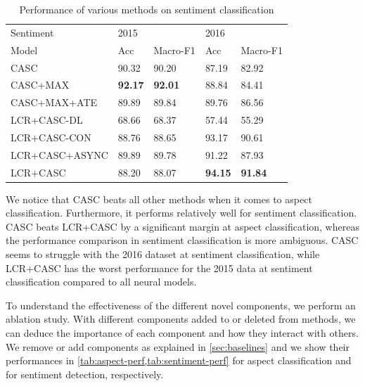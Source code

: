\documentclass[american, oneside]{ecsgdp}
\begin{document}
\begin{table}[htbp]
\centering
\caption{Performance of various methods on sentiment classification}
\label{tab:sentiment-perf}
\begin{tabular}{@{\extracolsep{4pt}}lllll@{}}
\hline
Sentiment      & 2015           &                & 2016           &                \\ \cline{2-3} \cline{4-5}
Model          & Acc            & Macro-F1       & Acc            & Macro-F1       \\ \hline
CASC           & 90.32          & 90.20          & 87.19          & 82.92          \\
CASC+MAX       & \textbf{92.17} & \textbf{92.01} & 88.84          & 84.41          \\
CASC+MAX+ATE   & 89.89          & 89.84          & 89.76          & 86.56          \\
LCR+CASC-DL    & 68.66          & 68.37          & 57.44          & 55.29          \\
LCR+CASC-CON   & 88.76          & 88.65          & 93.17          & 90.61          \\
LCR+CASC+ASYNC & 89.89	        & 89.78	         & 91.22	      & 87.93          \\
LCR+CASC       & 88.20          & 88.07          & \textbf{94.15} & \textbf{91.84} \\ \hline
\end{tabular}%
\end{table}

We notice that CASC beats all other methods when it comes to aspect classification. Furthermore, it performs relatively well for sentiment classification. CASC beats LCR+CASC by a significant margin at aspect classification, whereas the performance comparison in sentiment classification is more ambiguous. CASC seems to struggle with the 2016 dataset at sentiment classification, while LCR+CASC has the worst performance for the 2015 data at sentiment classification compared to all neural models.

To understand the effectiveness of the different novel components, we perform an ablation study. With different components added to or deleted from methods, we can deduce the importance of each component and how they interact with others. We remove or add components as explained in \cref{sec:baselines} and we show their performances in \cref{tab:aspect-perf,tab:sentiment-perf} for aspect classification and for sentiment detection, respectively.
\end{document}

